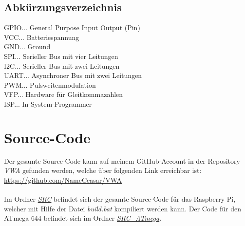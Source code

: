\documentclass[12pt]{article}
\begin{document}
\subsection{Abkürzungsverzeichnis}
GPIO... General Purpose Input Output (Pin)\\
VCC... Batteriespannung\\
GND... Ground\\
SPI... Serieller Bus mit vier Leitungen\\
I2C... Serieller Bus mit zwei Leitungen\\
UART... Asynchroner Bus mit zwei Leitungen\\
PWM... Pulsweitenmodulation\\
VFP... Hardware für Gleitkommazahlen\\
ISP... In-System-Programmer
\newpage\section{Source-Code}
Der gesamte Source-Code kann auf meinem GitHub-Account in der Repository \textit{VWA} gefunden werden, welche über folgenden Link erreichbar ist:\\ \hyperlink{https://github.com/NameCeasar/VWA}{https://github.com/NameCeasar/VWA}\\\\
Im Ordner \hyperlink{https://github.com/NameCeasar/VWA/tree/master/SRC}{\textit{SRC}} befindet sich der gesamte Source-Code für das Raspberry Pi, welcher mit Hilfe der Datei \textit{build.bat} kompiliert werden kann. Der Code für den ATmega 644 befindet sich im Ordner \hyperlink{https://github.com/NameCeasar/VWA/tree/master/SRC_ATmega/VWA}{\textit{SRC\_ATmega}}.
\end{document}
